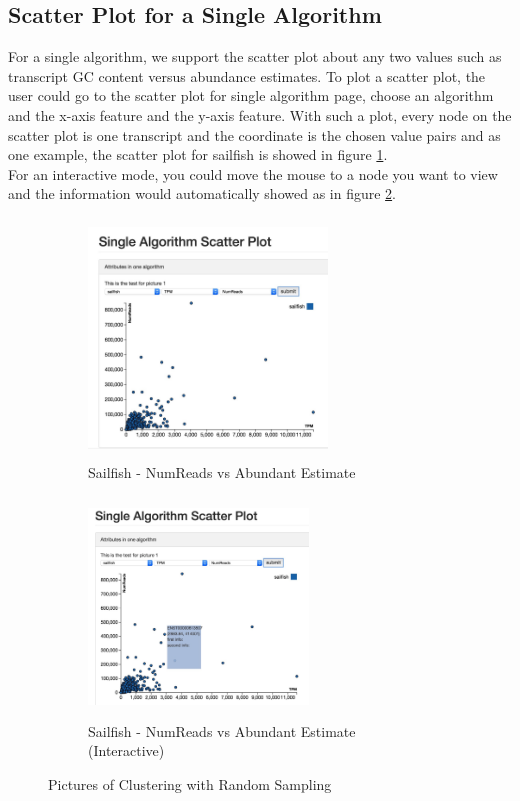 \documentclass[11pt,letter]{article}
\begin{document}
\subsection {Scatter Plot for a Single Algorithm}
For a single algorithm, we support the scatter plot about any two values such as transcript GC content versus abundance estimates. To plot a scatter plot, the user could go to the scatter plot for single algorithm page, choose an algorithm and the x-axis feature and the y-axis feature. With such a plot, every node on the scatter plot is one transcript and the coordinate is the chosen value pairs and as one example, the scatter plot for sailfish is showed in figure \ref{fig:single_algo_sailfish}. \\
For an interactive mode, you could move the mouse to a node you want to view and the information would automatically showed as in figure \ref{fig:interactive_single_algo_sailfish}.

\begin{figure}[h!]
        \centering
	\begin{subfigure}[h]{0.5\textwidth}
                \includegraphics[height=2.5in, width=2.5in]{fig/single_algo_sailfish.jpg}
		\caption{Sailfish - NumReads vs Abundant Estimate}
                \label{fig:single_algo_sailfish}
        \end{subfigure}%
        \begin{subfigure}[h]{0.5\textwidth}
                \includegraphics[height=2.3in, width=2.3in]{fig/interactive_single_algo_sailfish.jpg}
                \caption{Sailfish - NumReads vs Abundant Estimate (Interactive)}
                \label{fig:interactive_single_algo_sailfish}
        \end{subfigure}
        \caption{Pictures of Clustering with Random Sampling}\label{fig:cluster}
\end{figure}
\end{document}
